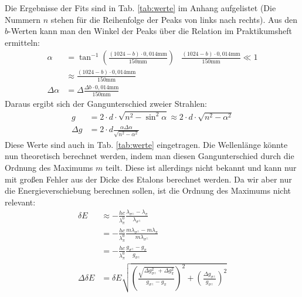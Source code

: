 Die Ergebnisse der Fits sind in Tab. \ref{tab:werte} im Anhang aufgelistet (Die Nummern $n$ stehen für die Reihenfolge der Peaks von links nach rechts). Aus den $b$-Werten kann man den Winkel der Peaks über die Relation im Praktikumsheft ermitteln:
\begin{align*}
\alpha &= \tan^{-1}\left(\frac{(1024-b)\cdot 0,014\si{\milli\meter}}{150\si{\milli\meter}}\right) & \frac{(1024-b)\cdot 0,014\si{\milli\meter}}{150\si{\milli\meter}} \ll 1\\
&\approx \frac{(1024-b)\cdot 0,014\si{\milli\meter}}{150\si{\milli\meter}}\\
\Delta \alpha &= \Delta \frac{\Delta b\cdot 0,014\si{\milli\meter}}{150\si{\milli\meter}}
\end{align*}   
Daraus ergibt sich der Gangunterschied zweier Strahlen:
\begin{align*}
g &= 2\cdot d \cdot \sqrt{n^2 - \sin^2{\alpha}} \approx 2\cdot d \cdot \sqrt{n^2 - \alpha^2}\\
\Delta g &= 2\cdot d \frac{\alpha \Delta\alpha}{\sqrt{n^2 - \alpha^2}}
\end{align*}
Diese Werte sind auch in Tab. \ref{tab:werte} eingetragen. Die Wellenlänge könnte nun theoretisch berechnet werden, indem man diesen Gangunterschied durch die Ordnung des Maximums $m$ teilt. Diese ist allerdings nicht bekannt und kann nur mit großen Fehler aus der Dicke des Etalons berechnet werden. Da wir aber nur die Energieverschiebung berechnen sollen, ist die Ordnung des Maximums nicht relevant:
\begin{align*}
\delta E &\approx -\frac{hc}{\lambda_\pi^0} \frac{\lambda_{\sigma^\pm} - \lambda_\pi}{\lambda_{\sigma^\pm}}\\
	&= -\frac{hc}{\lambda_\pi^0} \frac{m \lambda_{\sigma^\pm} - m \lambda_\pi}{m\lambda_{\sigma^\pm}}\\
	& = -\frac{hc}{\lambda_\pi^0} \frac{g_{\sigma^\pm} - g_\pi}{g_{\sigma^\pm}}\\
\Delta \delta E &= \delta E \sqrt{\left(\frac{\sqrt{\Delta g_{\sigma^\pm}^2 + \Delta g_\pi^2}}{g_{\sigma^\pm} - g_\pi}\right)^2 + \left(\frac{\Delta g_{\sigma^\pm}}{g_{\sigma^\pm}}\right)^2}
\end{align*}


